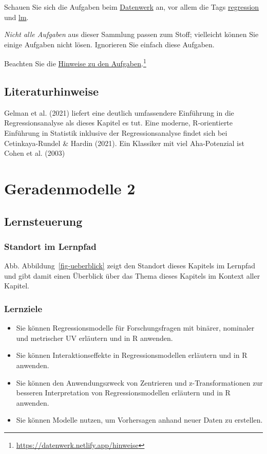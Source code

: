 \documentclass[
  a4paper,
]{scrbook}
\providecommand{\tightlist}{%
  \setlength{\itemsep}{0pt}\setlength{\parskip}{0pt}}\usepackage{longtable,booktabs,array}
\theoremstyle{definition}
\theoremstyle{definition}
\theoremstyle{definition}
\theoremstyle{remark}
\begin{document}
Schauen Sie sich die Aufgaben beim
\href{https://datenwerk.netlify.app/}{Datenwerk} an, vor allem die Tags
\href{https://datenwerk.netlify.app/\#category=regression}{regression}
und \href{https://datenwerk.netlify.app/\#category=lm}{lm}.

\emph{Nicht alle Aufgaben} aus dieser Sammlung passen zum Stoff;
vielleicht können Sie einige Aufgaben nicht lösen. Ignorieren Sie
einfach diese Aufgaben.

Beachten Sie die \href{https://datenwerk.netlify.app/hinweise}{Hinweise
zu den Aufgaben}.\footnote{\url{https://datenwerk.netlify.app/hinweise}}

\section{Literaturhinweise}\label{literaturhinweise-6}

Gelman et al. (2021) liefert eine deutlich umfassendere Einführung in
die Regressionsanalyse als dieses Kapitel es tut. Eine moderne,
R-orientierte Einführung in Statistik inklusive der Regressionsanalyse
findet sich bei Cetinkaya-Rundel \& Hardin (2021). Ein Klassiker mit
viel Aha-Potenzial ist Cohen et al. (2003)

\chapter{Geradenmodelle 2}\label{geradenmodelle-2}

\section{Lernsteuerung}\label{lernsteuerung-8}

\subsection{Standort im Lernpfad}\label{standort-im-lernpfad-1}

Abb. Abbildung~\ref{fig-ueberblick} zeigt den Standort dieses Kapitels
im Lernpfad und gibt damit einen Überblick über das Thema dieses
Kapitels im Kontext aller Kapitel.

\subsection{Lernziele}\label{lernziele-9}

\begin{itemize}
\tightlist
\item
  Sie können Regressionsmodelle für Forschungsfragen mit binärer,
  nominaler und metrischer UV erläutern und in R anwenden.
\item
  Sie können Interaktionseffekte in Regressionsmodellen erläutern und in
  R anwenden.
\item
  Sie können den Anwendungszweck von Zentrieren und z-Transformationen
  zur besseren Interpretation von Regressionsmodellen erläutern und in R
  anwenden.
\item
  Sie können Modelle nutzen, um Vorhersagen anhand neuer Daten zu
  erstellen.
\end{itemize}
\end{document}
